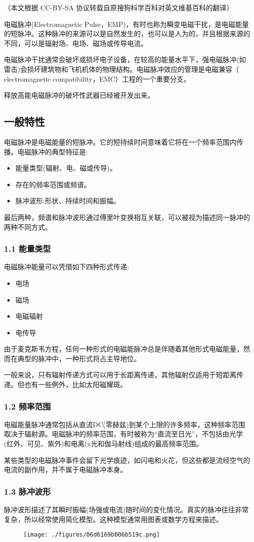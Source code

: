 
（本文根据 CC-BY-SA 协议转载自原搜狗科学百科对英文维基百科的翻译）

电磁脉冲(Electromagnetic Pulse，EMP)，有时也称为瞬变电磁干扰，是电磁能量的短脉冲。这种脉冲的来源可以是自然发生的，也可以是人为的，并且根据来源的不同，可以是辐射场、电场、磁场或传导电流。

电磁脉冲干扰通常会破坏或损坏电子设备，在较高的能量水平下，强电磁脉冲(如雷击)会损坏建筑物和飞机机体的物理结构。电磁脉冲效应的管理是电磁兼容（ electromagnetic compatibility，EMC）工程的一个重要分支。

释放高能电磁脉冲的破坏性武器已经被开发出来。

\subsection{一般特性}
电磁脉冲是电磁能量的短脉冲。它的短持续时间意味着它将在一个频率范围内传播。电磁脉冲的典型特征是:
\begin{itemize}
\item 能量类型(辐射、电、磁或传导)。
\item 存在的频率范围或频谱。
\item 脉冲波形:形状、持续时间和振幅。
\end{itemize}
最后两种，频谱和脉冲波形通过傅里叶变换相互关联，可以被视为描述同一脉冲的两种不同方式。
\subsubsection{1.1 能量类型}
电磁脉冲能量可以凭借如下四种形式传递:
\begin{itemize}
\item 电场
\item 磁场
\item 电磁辐射
\item 电传导
\end{itemize}
由于麦克斯韦方程，任何一种形式的电磁能脉冲总是伴随着其他形式电磁能量，然而在典型的脉冲中，一种形式将占主导地位。

一般来说，只有辐射传递方式可以用于长距离传递，其他辐射仅适用于短距离传递。但也有一些例外，比如太阳磁耀斑。
\subsubsection{1.2 频率范围}
电磁能量脉冲通常包括从直流DC(零赫兹)到某个上限的许多频率，这种频率范围取决于辐射源。电磁脉冲的频率范围，有时被称为“直流至日光”，不包括由光学(红外、可见、紫外)和电离(x光和伽马射线)组成的最高频率范围。

某些类型的电磁脉冲事件会留下光学痕迹，如闪电和火花，但这些都是流经空气的电流的副作用，并不属于电磁脉冲本身。
\subsubsection{1.3 脉冲波形}
脉冲波形描述了其瞬时振幅(场强或电流)随时间的变化情况。真实的脉冲往往非常复杂，所以经常使用简化模型。这种模型通常用图表或数学方程来描述。
\begin{figure}[ht]
\centering
\texttt{[image: ./figures/06d6169b006b519c.png]}
\caption{} \label{fig_DCMC_1}
\end{figure}